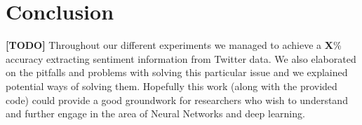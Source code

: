 \documentclass[11pt,onecolumn]{article} %
\begin{document}
\section{Conclusion}
\textbf{[TODO]}
Throughout our different experiments we managed to achieve a \textbf{X}\% accuracy extracting sentiment information from Twitter data. We also elaborated on the pitfalls and problems with solving this particular issue and we explained potential ways of solving them.
Hopefully this work (along with the provided code) could provide a good groundwork for researchers who wish to understand and further engage in the area of Neural Networks and deep learning.

\end{document}
